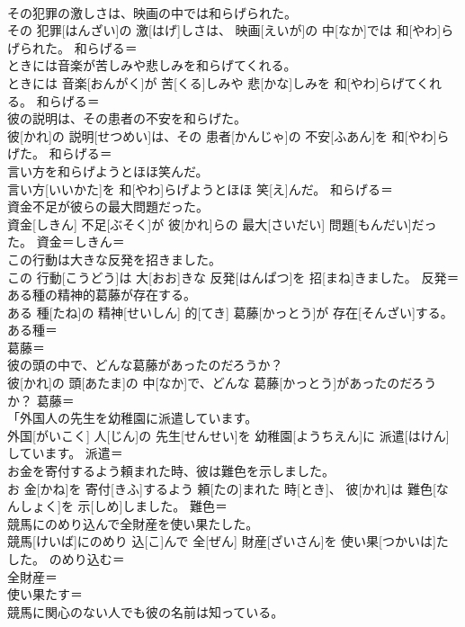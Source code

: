 \documentclass[8pt]{extreport}
\begin{document}
\begin{CJK}{UTF8}{min}
\\	その犯罪の激しさは、映画の中では和らげられた。	
\\	その 犯罪[はんざい]の 激[はげ]しさは、 映画[えいが]の 中[なか]では 和[やわ]らげられた。	和らげる＝ 
\\	ときには音楽が苦しみや悲しみを和らげてくれる。	
\\	ときには 音楽[おんがく]が 苦[くる]しみや 悲[かな]しみを 和[やわ]らげてくれる。	和らげる＝ 
\\	彼の説明は、その患者の不安を和らげた。	
\\	彼[かれ]の 説明[せつめい]は、その 患者[かんじゃ]の 不安[ふあん]を 和[やわ]らげた。	和らげる＝ 
\\	言い方を和らげようとほほ笑んだ。	
\\	言い方[いいかた]を 和[やわ]らげようとほほ 笑[え]んだ。	和らげる＝ 
\\	資金不足が彼らの最大問題だった。	
\\	資金[しきん] 不足[ぶそく]が 彼[かれ]らの 最大[さいだい] 問題[もんだい]だった。	資金＝しきん＝ 
\\	この行動は大きな反発を招きました。	
\\	この 行動[こうどう]は 大[おお]きな 反発[はんぱつ]を 招[まね]きました。	反発＝ 
\\	ある種の精神的葛藤が存在する。	
\\	ある 種[たね]の 精神[せいしん] 的[てき] 葛藤[かっとう]が 存在[そんざい]する。	ある種＝ 
\\	葛藤＝ 
\\	彼の頭の中で、どんな葛藤があったのだろうか？	
\\	彼[かれ]の 頭[あたま]の 中[なか]で、どんな 葛藤[かっとう]があったのだろうか？	葛藤＝ 
\\	「外国人の先生を幼稚園に派遣しています。	
\\	外国[がいこく] 人[じん]の 先生[せんせい]を 幼稚園[ようちえん]に 派遣[はけん]しています。	派遣＝ 
\\	お金を寄付するよう頼まれた時、彼は難色を示しました。	
\\	お 金[かね]を 寄付[きふ]するよう 頼[たの]まれた 時[とき]、 彼[かれ]は 難色[なんしょく]を 示[しめ]しました。	難色＝ 
\\	競馬にのめり込んで全財産を使い果たした。	
\\	競馬[けいば]にのめり 込[こ]んで 全[ぜん] 財産[ざいさん]を 使い果[つかいは]たした。	のめり込む＝ 
\\	全財産＝ 
\\	使い果たす＝ 
\\	競馬に関心のない人でも彼の名前は知っている。	

\end{CJK}
\end{document}
